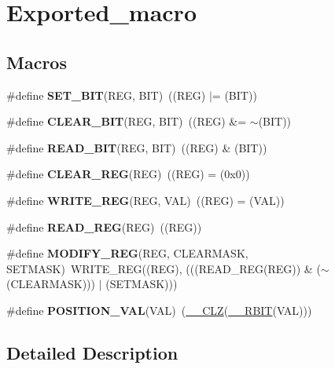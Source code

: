 \hypertarget{group___exported__macro}{}\section{Exported\+\_\+macro}
\label{group___exported__macro}
\subsection*{Macros}
\begin{DoxyCompactItemize}
\item 
\mbox{\label{group___exported__macro_ga26474f43799fbade9cf300e21dd3a91a}} 
\#define {\bfseries S\+E\+T\+\_\+\+B\+IT}(R\+EG,  B\+IT)~((R\+EG) $\vert$= (B\+IT))
\item 
\mbox{\label{group___exported__macro_ga133aae6fc0d41bffab39ab223a7001de}} 
\#define {\bfseries C\+L\+E\+A\+R\+\_\+\+B\+IT}(R\+EG,  B\+IT)~((R\+EG) \&= $\sim$(B\+IT))
\item 
\mbox{\label{group___exported__macro_ga822bb1bb9710d5f2fa6396b84e583c33}} 
\#define {\bfseries R\+E\+A\+D\+\_\+\+B\+IT}(R\+EG,  B\+IT)~((R\+EG) \& (B\+IT))
\item 
\mbox{\label{group___exported__macro_ga1378fbdda39f40b85420df55f41460ef}} 
\#define {\bfseries C\+L\+E\+A\+R\+\_\+\+R\+EG}(R\+EG)~((R\+EG) = (0x0))
\item 
\mbox{\label{group___exported__macro_ga32f78bffcaf6d13023dcd7f05e0c4d57}} 
\#define {\bfseries W\+R\+I\+T\+E\+\_\+\+R\+EG}(R\+EG,  V\+AL)~((R\+EG) = (V\+AL))
\item 
\mbox{\label{group___exported__macro_gae7f188a4d26c9e713a48414783421071}} 
\#define {\bfseries R\+E\+A\+D\+\_\+\+R\+EG}(R\+EG)~((R\+EG))
\item 
\mbox{\label{group___exported__macro_ga6553c99f510c3bab8cc0a91602053247}} 
\#define {\bfseries M\+O\+D\+I\+F\+Y\+\_\+\+R\+EG}(R\+EG,  C\+L\+E\+A\+R\+M\+A\+SK,  S\+E\+T\+M\+A\+SK)~W\+R\+I\+T\+E\+\_\+\+R\+EG((R\+EG), (((R\+E\+A\+D\+\_\+\+R\+EG(R\+EG)) \& ($\sim$(C\+L\+E\+A\+R\+M\+A\+SK))) $\vert$ (S\+E\+T\+M\+A\+SK)))
\item 
\mbox{\label{group___exported__macro_ga47a8870d71d55cefb3df47cd8c815ec8}} 
\#define {\bfseries P\+O\+S\+I\+T\+I\+O\+N\+\_\+\+V\+AL}(V\+AL)~(\mbox{\hyperlink{group___c_m_s_i_s___core___instruction_interface_ga5d5bb1527e042be4a9fa5a33f65cc248}{\+\_\+\+\_\+\+C\+LZ}}(\mbox{\hyperlink{group___c_m_s_i_s___core___instruction_interface_gaf944a7b7d8fd70164cca27669316bcf7}{\+\_\+\+\_\+\+R\+B\+IT}}(V\+AL)))
\end{DoxyCompactItemize}


\subsection{Detailed Description}
